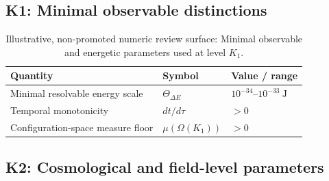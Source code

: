 
\subsection*{K1: Minimal observable distinctions}

\begin{table}[htbp]
  \centering
  \caption{Illustrative, non-promoted numeric review surface: Minimal observable and energetic parameters used at level \(K_1\).}
  \label{tab:k1-minimal-observable-parameters}
  \begin{tabular}{@{}L{0.42\textwidth}L{0.18\textwidth}L{0.25\textwidth}@{}}
    \hline
    Quantity & Symbol & Value / range \\
    \hline
    Minimal resolvable energy scale & \(\Theta_{\Delta E}\)
        & \(10^{-34}\text{--}10^{-33}~\mathrm{J}\) \\
    Temporal monotonicity & \(dt/d\tau\)
        & \(> 0\) \\
    Configuration-space measure floor & \(\mu(\Omega(K_1))\)
        & \(> 0\) \\
    \hline
\end{tabular}
\end{table}



\subsection*{K2: Cosmological and field-level parameters}

